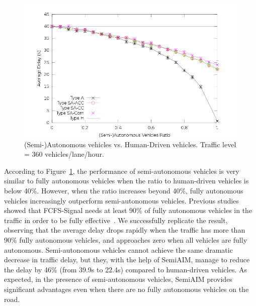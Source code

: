 


\begin{figure}
\centering
\includegraphics[width=0.9\columnwidth]{figures/figure_1.png}
\caption{(Semi-)Autonomous vehicles vs. Human-Driven vehicles. Traffic
level = 360 vehicles/lane/hour.}
\label{fig:two360}
\end{figure}

According to Figure~\ref{fig:two360}, the performance of
semi-autonomous vehicles is very similar to fully autonomous vehicles
when the ratio to human-driven vehicles is below 40\%.  However, when
the ratio increases beyond 40\%, fully autonomous vehicles
increasingly outperform semi-autonomous vehicles.  Previous studies
showed that FCFS-Signal needs at least 90\% of fully autonomous
vehicles in the traffic in order to be fully
effective~\cite{bib:Dresner07Sharing}.  We successfully replicate the
result, observing that the average delay drops rapidly when the
traffic has more than 90\% fully autonomous vehicles, and approaches
zero when all vehicles are fully autonomous.  Semi-autonomous vehicles
cannot achieve the same dramatic decrease in traffic delay, but they,
with the help of SemiAIM, manage to reduce the delay by 46\% (from
39.9s to 22.4s) compared to human-driven vehicles.  As expected, in
the presence of semi-autonomous vehicles, SemiAIM provides significant
advantages even when there are no fully autonomous vehicles on the
road.



